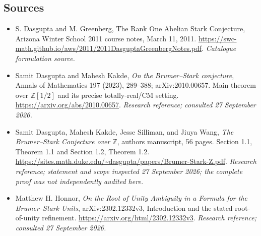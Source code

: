 \documentclass[11pt,a4paper]{article}
\newcommand{\Z}{\mathbb{Z}}
\numberwithin{equation}{section}
\begin{document}
\subsection{Sources}
\begin{itemize}\raggedright
\item[\textnormal{[S1]}]\hypertarget{source:statement:1}{} S. Dasgupta and M. Greenberg, The Rank One Abelian Stark Conjecture, Arizona Winter School 2011 course notes, March 11, 2011.
\url{https://swc-math.github.io/aws/2011/2011DasguptaGreenbergNotes.pdf}.
{\small\textit{Catalogue formulation source.}}
\item[\textnormal{[E1]}]\hypertarget{extra:statement:1}{} Samit Dasgupta and Mahesh Kakde, \emph{On the Brumer--Stark conjecture}, Annals of Mathematics 197 (2023), 289--388; arXiv:2010.00657. Main theorem over $\Z[1/2]$ and its precise totally-real/CM setting.
\url{https://arxiv.org/abs/2010.00657}.
{\small\textit{Research reference; consulted 27 September 2026.}}
\item[\textnormal{[E2]}]\hypertarget{extra:statement:2}{} Samit Dasgupta, Mahesh Kakde, Jesse Silliman, and Jiuya Wang, \emph{The Brumer--Stark Conjecture over $\Z$}, authors\textquotesingle{} manuscript, 56 pages. Section 1.1, Theorem 1.1 and Section 1.2, Theorem 1.2.
\url{https://sites.math.duke.edu/~dasgupta/papers/Brumer-Stark-Z.pdf}.
{\small\textit{Research reference; statement and scope inspected 27 September 2026; the complete proof was not independently audited here.}}
\item[\textnormal{[E3]}]\hypertarget{extra:statement:3}{} Matthew H. Honnor, \emph{On the Root of Unity Ambiguity in a Formula for the Brumer--Stark Units}, arXiv:2302.12332v3, Introduction and the stated root-of-unity refinement.
\url{https://arxiv.org/html/2302.12332v3}.
{\small\textit{Research reference; consulted 27 September 2026.}}
\end{itemize}
\end{document}
